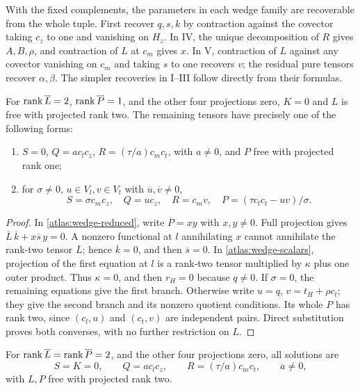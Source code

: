 \begin{remark}\label{atlas:wedge-parameters}
With the fixed complements, the parameters in each wedge family are
recoverable from the whole tuple.  First recover \(q,s,k\) by contraction
against the covector taking \(c_z\) to one and vanishing on \(H_z\).
In IV, the unique decomposition of \(R\) gives \(A,B,\rho\), and
contraction of \(L\) at \(c_m\) gives \(x\).  In V, contraction of \(L\)
against any covector vanishing on \(c_m\) and taking \(s\) to one recovers
\(v\); the residual pure tensors recover \(\alpha,\beta\).
The simpler recoveries in I--III follow directly from their formulas.
\end{remark}

\begin{proposition}\label{atlas:wedge21}
For \(\operatorname{rank}\overline L=2\), \(\operatorname{rank}\overline P=1\), and the other four
projections zero, \(K=0\) and \(L\) is free with projected rank two.
The remaining tensors have precisely one of the following forms:
\begin{enumerate}
\item \(S=0\), \(Q=a c_lc_z\), \(R=(\tau/a)c_mc_t\), with \(a\ne0\),
and \(P\) free with projected rank one;
\item for \(\sigma\ne0\), \(u\in V_l,v\in V_t\) with
\(\overline u,\overline v\ne0\),
\[
 S=\sigma c_mc_z,\quad Q=u c_z,\quad R=c_mv,\quad
 P=(\tau c_lc_t-uv)/\sigma.
\]
\end{enumerate}
\end{proposition}

\begin{proof}
In \eqref{atlas:wedge-reduced}, write \(\overline P=xy\) with
\(x,y\ne0\).  Full projection gives
\(\overline L\,\overline k+x\overline s\,y=0\).
A nonzero functional at \(l\) annihilating \(x\) cannot annihilate the
rank-two tensor \(\overline L\); hence \(\overline k=0\), and then
\(\overline s=0\).  In \eqref{atlas:wedge-scalars}, projection of the
first equation at \(l\) is a rank-two tensor multiplied by \(\kappa\)
plus one outer product.  Thus \(\kappa=0\), and then \(r_H=0\) because
\(q\ne0\).  If \(\sigma=0\), the remaining equations give the first
branch.  Otherwise write \(u=q\), \(v=t_H+\rho c_t\); they give the second
branch and its nonzero quotient conditions.  Its whole \(P\) has rank two,
since \((c_l,u)\) and \((c_t,v)\) are independent pairs.  Direct substitution
proves both converses, with no further restriction on \(L\).
\end{proof}

\begin{proposition}\label{atlas:wedge22}
For \(\operatorname{rank}\overline L=\operatorname{rank}\overline P=2\), and the other four projections
zero, all solutions are
\[
 S=K=0,\qquad Q=a c_lc_z,\qquad R=(\tau/a)c_mc_t,\qquad a\ne0,
\]
with \(L,P\) free with projected rank two.
\end{proposition}

